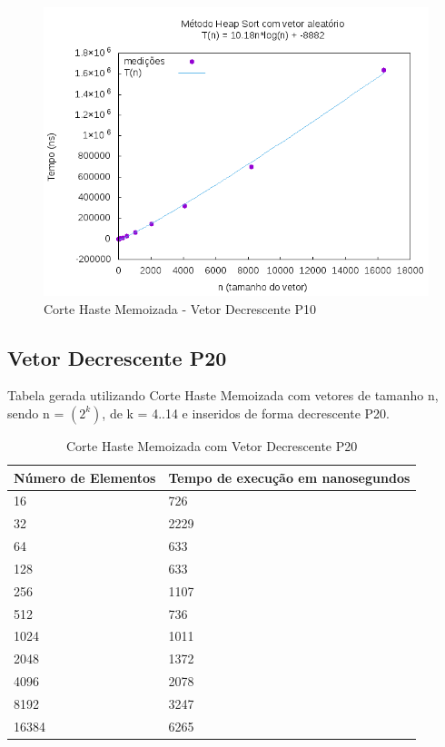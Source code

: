 \documentclass[12pt,a4paper,twoside]{report}
\begin{document}
\begin{figure}[H]
    \centering
    \includegraphics[width=0.7\linewidth]{graficos/HeapSort/vIntAleatorio/vIntAleatorio.png}
  \caption{Corte Haste Memoizada - Vetor Decrescente P10}
\end{figure}

\subsection{Vetor Decrescente P20}
Tabela gerada utilizando Corte Haste Memoizada com vetores de tamanho n, sendo n = $(2^k)$, de k = 4..14 e inseridos de forma decrescente P20.
\begin{table}[H]
\centering
\caption{Corte Haste Memoizada com Vetor Decrescente P20}
\label{my-label}
\begin{tabular}{|l|l|}
\hline
\multicolumn{1}{|c|}{\textbf{Número de Elementos}} & \multicolumn{1}{c|}{\textbf{Tempo de execução em nanosegundos}} \\ \hline
16 & 726 \\ \hline
32 & 2229 \\ \hline
64 & 633 \\ \hline
128 & 633 \\ \hline
256 & 1107 \\ \hline
512 & 736 \\ \hline
1024 & 1011 \\ \hline
2048 & 1372 \\ \hline
4096 & 2078 \\ \hline
8192 & 3247 \\ \hline
16384 & 6265 \\ \hline

\end{tabular}
\end{table}
\end{document}
